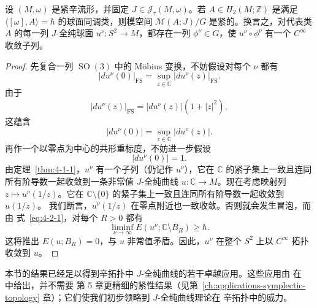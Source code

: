 \begin{theorem}\label{thm:4-2-11}
设 $(M,\omega)$ 是紧辛流形，并固定 $J\in\mathcal J_\tau(M,\omega)$。若
$A\in H_2(M;\mathbb Z)$ 是满足
$\langle[\omega],A\rangle=\hbar$ 的球面同调类，则模空间
$\mathcal M(A;J)/G$ 是紧的。换言之，对代表类 $A$ 的每一列 $J$-全纯球面
$u^\nu:S^2\to M$，都存在一列 $\phi^\nu\in G$，使 $u^\nu\circ\phi^\nu$ 有一个
$C^\infty$ 收敛子列。
\end{theorem}

\begin{proof}
先复合一列 $\operatorname{SO}(3)$ 中的 Möbius 变换，不妨假设对每个 $\nu$ 都有
\[
  |du^\nu(0)|_{\mathrm{FS}}
  =\sup_{z\in\mathbb C}|du^\nu(z)|_{\mathrm{FS}}.
\]
由于
\[
  |du^\nu(z)|_{\mathrm{FS}}
  =|du^\nu(z)|(1+|z|^2),
\]
这蕴含
\[
  |du^\nu(0)|=\sup_{z\in\mathbb C}|du^\nu(z)|.
\]
再作一个以零点为中心的共形重标度，不妨进一步假设
\[
  |du^\nu(0)|=1.
\]
由定理~\ref{thm:4-1-1}，$u^\nu$ 有一个子列（仍记作 $u^\nu$），它在
$\mathbb C$ 的紧子集上一致且连同所有阶导数一起收敛到一条非常值 $J$-全纯曲线
$u:\mathbb C\to M$。现在考虑映射列 $z\mapsto u^\nu(1/z)$。它在
$\mathbb C\setminus\{0\}$ 的紧子集上一致且连同所有阶导数一起收敛到 $u(1/z)$。
我们断言，$u^\nu(1/z)$ 在零点附近也一致收敛。否则就会发生冒泡，而由
式~\eqref{eq:4-2-1}，对每个 $R>0$ 都有
\[
  \liminf_{\nu\to\infty}E(u^\nu;\mathbb C\setminus B_R)\ge\hbar.
\]
这将推出 $E(u;B_R)=0$，与 $u$ 非常值矛盾。因此，$u^\nu$ 在整个 $S^2$ 上以
$C^\infty$ 拓扑收敛到 $u$。
\end{proof}

本节的结果已经足以得到辛拓扑中 $J$-全纯曲线的若干卓越应用。这些应用由
在 \, 中给出，并不需要
第 5 章更精细的紧性结果（见第~\ref{ch:applications-symplectic-topology} 章）；它们使我们初步领略到 $J$-全纯曲线理论在
辛拓扑中的威力。
